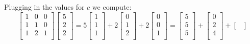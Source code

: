 \documentclass[12pt,letterpaper]{article}
\begin{document}
\begin{enumerate}
\begin{enumerate}
\begin{itemize}
              Plugging in the values for $c$ we compute:
              \[
                \begin{bmatrix}
                   1 &  0 &  0 \\
                   1 &  1 &  0 \\
                   1 &  2 &  1 \\
                \end{bmatrix}
                \begin{bmatrix}
                  5 \\
                  2 \\
                  2 \\
                \end{bmatrix}
                =
                5
                \begin{bmatrix}
                  1 \\
                  1 \\
                  1 \\
                \end{bmatrix}
                +
                2
                \begin{bmatrix}
                   0 \\
                   1 \\
                   2 \\
                \end{bmatrix}
                +
                2
                \begin{bmatrix}
                   0 \\
                   0 \\
                   1 \\
                \end{bmatrix}
                =
                \begin{bmatrix}
                  5 \\
                  5 \\
                  5 \\
                \end{bmatrix}
                +
                \begin{bmatrix}
                   0 \\
                   2 \\
                   4 \\
                \end{bmatrix}
                +
                \begin{bmatrix}

\end{bmatrix}\]
\end{itemize}
\end{enumerate}
\end{enumerate}
\end{document}
